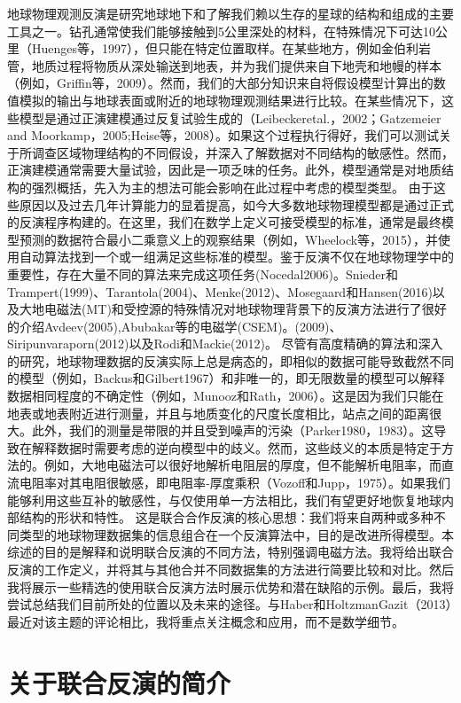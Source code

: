 地球物理观测反演是研究地球地下和了解我们赖以生存的星球的结构和组成的主要工具之一。钻孔通常使我们能够接触到5公里深处的材料，在特殊情况下可达10公里（Huenges等，1997），但只能在特定位置取样。在某些地方，例如金伯利岩管，地质过程将物质从深处输送到地表，并为我们提供来自下地壳和地幔的样本（例如，Griffin等，2009）。然而，我们的大部分知识来自将假设模型计算出的数值模拟的输出与地球表面或附近的地球物理观测结果进行比较。在某些情况下，这些模型是通过正演建模通过反复试验生成的（Leibeckeretal.，2002；Gatzemeier and Moorkamp，2005;Heise等，2008）。如果这个过程执行得好，我们可以测试关于所调查区域物理结构的不同假设，并深入了解数据对不同结构的敏感性。然而，正演建模通常需要大量试验，因此是一项乏味的任务。此外，模型通常是对地质结构的强烈概括，先入为主的想法可能会影响在此过程中考虑的模型类型。
由于这些原因以及过去几年计算能力的显着提高，如今大多数地球物理模型都是通过正式的反演程序构建的。在这里，我们在数学上定义可接受模型的标准，通常是最终模型预测的数据符合最小二乘意义上的观察结果（例如，Wheelock等，2015），并使用自动算法找到一个或一组满足这些标准的模型。鉴于反演不仅在地球物理学中的重要性，存在大量不同的算法来完成这项任务(Nocedal2006)。Snieder和Trampert(1999)、Tarantola(2004)、Menke(2012)、Mosegaard和Hansen(2016)以及大地电磁法(MT)和受控源的特殊情况对地球物理背景下的反演方法进行了很好的介绍Avdeev(2005),Abubakar等的电磁学(CSEM)。(2009)、Siripunvaraporn(2012)以及Rodi和Mackie(2012)。
尽管有高度精确的算法和深入的研究，地球物理数据的反演实际上总是病态的，即相似的数据可能导致截然不同的模型（例如，Backus和Gilbert1967）和非唯一的，即无限数量的模型可以解释数据相同程度的不确定性（例如，Munooz和Rath，2006）。这是因为我们只能在地表或地表附近进行测量，并且与地质变化的尺度长度相比，站点之间的距离很大。此外，我们的测量是带限的并且受到噪声的污染（Parker1980，1983）。这导致在解释数据时需要考虑的逆向模型中的歧义。然而，这些歧义的本质是特定于方法的。例如，大地电磁法可以很好地解析电阻层的厚度，但不能解析电阻率，而直流电阻率对其电阻很敏感，即电阻率‑厚度乘积（Vozoff和Jupp，1975）。如果我们能够利用这些互补的敏感性，与仅使用单一方法相比，我们有望更好地恢复地球内部结构的形状和特性。
这是联合合作反演的核心思想：我们将来自两种或多种不同类型的地球物理数据集的信息组合在一个反演算法中，目的是改进所得模型。本综述的目的是解释和说明联合反演的不同方法，特别强调电磁方法。我将给出联合反演的工作定义，并将其与其他合并不同数据集的方法进行简要比较和对比。然后我将展示一些精选的使用联合反演方法时展示优势和潜在缺陷的示例。最后，我将尝试总结我们目前所处的位置以及未来的途径。与Haber和HoltzmanGazit（2013）最近对该主题的评论相比，我将重点关注概念和应用，而不是数学细节。

\section{关于联合反演的简介}

